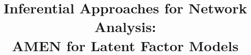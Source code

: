 \documentclass[12pt,pdflatex]{elsarticle}
\begin{document}
\thispagestyle{empty}
\begin{frontmatter}

\title{Inferential Approaches for Network Analysis: \\ AMEN for Latent Factor Models}





\end{frontmatter}
\end{document}
